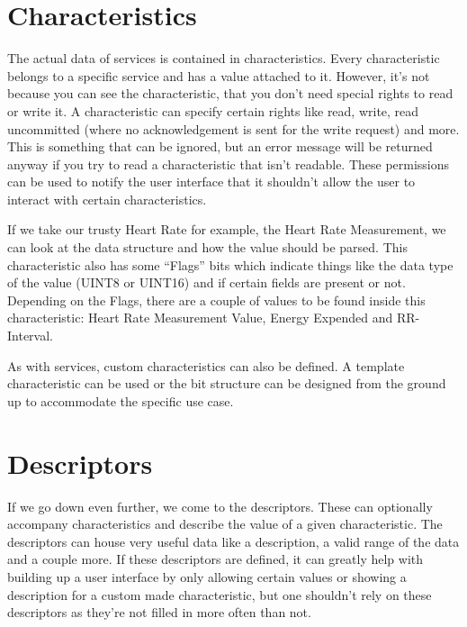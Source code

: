 \documentclass[pdftex,a4paper,12pt,twoside]{report}
\begin{document}
\section{Characteristics}
\label{sec:characteristics}
The actual data of services is contained in characteristics. Every characteristic belongs to a specific service and has a value attached to it. However, it's not because you can see the characteristic, that you don't need special rights to read or write it. A characteristic can specify certain rights like read, write, read uncommitted (where no acknowledgement is sent for the write request) and more. This is something that can be ignored, but an error message will be returned anyway if you try to read a characteristic that isn't readable. These permissions can be used to notify the user interface that it shouldn't allow the user to interact with certain characteristics.

If we take our trusty Heart Rate for example, the Heart Rate Measurement, we can look at the data structure and how the value should be parsed. This characteristic also has some ``Flags'' bits which indicate things like the data type of the value (UINT8 or UINT16) and if certain fields are present or not. Depending on the Flags, there are a couple of values to be found inside this characteristic: Heart Rate Measurement Value, Energy Expended and RR-Interval.

As with services, custom characteristics can also be defined. A template characteristic can be used or the bit structure can be designed from the ground up to accommodate the specific use case.

\section{Descriptors}
\label{sec:descriptors}
If we go down even further, we come to the descriptors. These can optionally accompany characteristics and describe the value of a given characteristic. The descriptors can house very useful data like a description, a valid range of the data and a couple more. If these descriptors are defined, it can greatly help with building up a user interface by only allowing certain values or showing a description for a custom made characteristic, but one shouldn't rely on these descriptors as they're not filled in more often than not.
\end{document}

